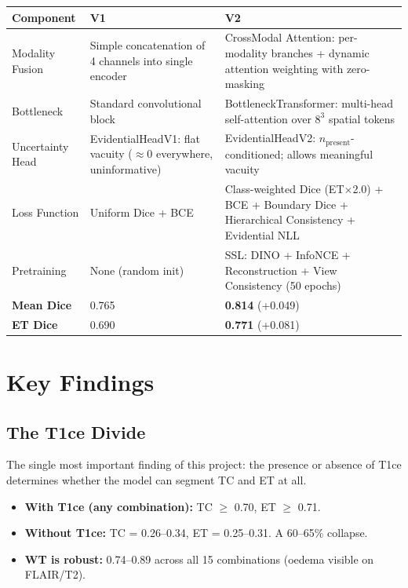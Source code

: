 \documentclass[12pt,a4paper]{article}
\begin{document}
\begin{center}
\footnotesize
\begin{tabular}{p{2.8cm}p{5cm}p{5cm}}
\toprule
\textbf{Component} & \textbf{V1} & \textbf{V2} \\
\midrule
Modality Fusion & Simple concatenation of 4 channels into single encoder & CrossModal Attention: per-modality branches + dynamic attention weighting with zero-masking \\
\midrule
Bottleneck & Standard convolutional block & BottleneckTransformer: multi-head self-attention over $8^3$ spatial tokens \\
\midrule
Uncertainty Head & EvidentialHeadV1: flat vacuity ($\approx$0 everywhere, uninformative) & EvidentialHeadV2: $n_{\text{present}}$-conditioned; allows meaningful vacuity \\
\midrule
Loss Function & Uniform Dice + BCE & Class-weighted Dice (ET$\times$2.0) + BCE + Boundary Dice + Hierarchical Consistency + Evidential NLL \\
\midrule
Pretraining & None (random init) & SSL: DINO + InfoNCE + Reconstruction + View Consistency (50 epochs) \\
\midrule
\textbf{Mean Dice} & 0.765 & \textbf{0.814} (+0.049) \\
\textbf{ET Dice} & 0.690 & \textbf{0.771} (+0.081) \\
\bottomrule
\end{tabular}
\end{center}

\section{Key Findings}

\subsection{The T1ce Divide}

The single most important finding of this project: the presence or absence of T1ce determines whether the model can segment TC and ET at all.

\begin{itemize}[noitemsep]
  \item \textbf{With T1ce (any combination):} TC $\geq$ 0.70, ET $\geq$ 0.71.
  \item \textbf{Without T1ce:} TC = 0.26--0.34, ET = 0.25--0.31. A 60--65\% collapse.
  \item \textbf{WT is robust:} 0.74--0.89 across all 15 combinations (oedema visible on FLAIR/T2).
\end{itemize}
\end{document}
